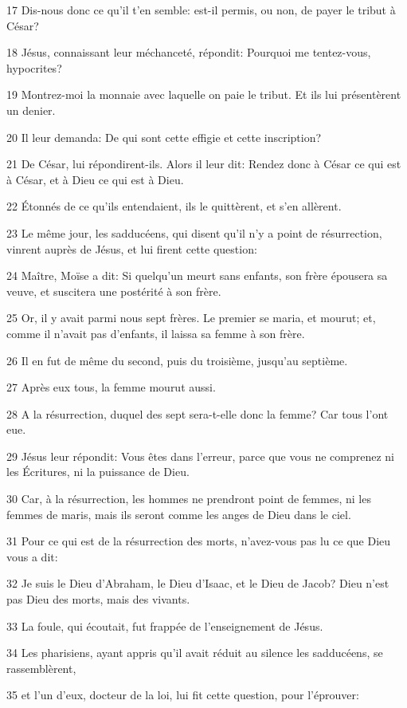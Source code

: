 \par 17 Dis-nous donc ce qu'il t'en semble: est-il permis, ou non, de payer le tribut à César?
\par 18 Jésus, connaissant leur méchanceté, répondit: Pourquoi me tentez-vous, hypocrites?
\par 19 Montrez-moi la monnaie avec laquelle on paie le tribut. Et ils lui présentèrent un denier.
\par 20 Il leur demanda: De qui sont cette effigie et cette inscription?
\par 21 De César, lui répondirent-ils. Alors il leur dit: Rendez donc à César ce qui est à César, et à Dieu ce qui est à Dieu.
\par 22 Étonnés de ce qu'ils entendaient, ils le quittèrent, et s'en allèrent.
\par 23 Le même jour, les sadducéens, qui disent qu'il n'y a point de résurrection, vinrent auprès de Jésus, et lui firent cette question:
\par 24 Maître, Moïse a dit: Si quelqu'un meurt sans enfants, son frère épousera sa veuve, et suscitera une postérité à son frère.
\par 25 Or, il y avait parmi nous sept frères. Le premier se maria, et mourut; et, comme il n'avait pas d'enfants, il laissa sa femme à son frère.
\par 26 Il en fut de même du second, puis du troisième, jusqu'au septième.
\par 27 Après eux tous, la femme mourut aussi.
\par 28 A la résurrection, duquel des sept sera-t-elle donc la femme? Car tous l'ont eue.
\par 29 Jésus leur répondit: Vous êtes dans l'erreur, parce que vous ne comprenez ni les Écritures, ni la puissance de Dieu.
\par 30 Car, à la résurrection, les hommes ne prendront point de femmes, ni les femmes de maris, mais ils seront comme les anges de Dieu dans le ciel.
\par 31 Pour ce qui est de la résurrection des morts, n'avez-vous pas lu ce que Dieu vous a dit:
\par 32 Je suis le Dieu d'Abraham, le Dieu d'Isaac, et le Dieu de Jacob? Dieu n'est pas Dieu des morts, mais des vivants.
\par 33 La foule, qui écoutait, fut frappée de l'enseignement de Jésus.
\par 34 Les pharisiens, ayant appris qu'il avait réduit au silence les sadducéens, se rassemblèrent,
\par 35 et l'un d'eux, docteur de la loi, lui fit cette question, pour l'éprouver:
